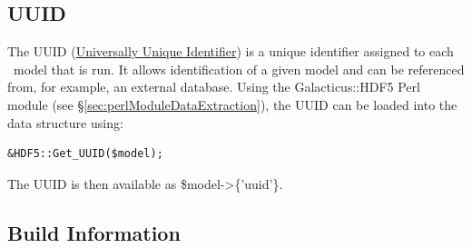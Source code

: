 \subsection{UUID}\label{sec:UUID}

The UUID (\href{https://secure.wikimedia.org/wikipedia/en/wiki/Universally_unique_identifier}{Universally Unique Identifier}) is a unique identifier assigned to each \glc\ model that is run. It allows identification of a given model and can be referenced from, for example, an external database. Using the {\normalfont \ttfamily Galacticus::HDF5} Perl module (see \S\ref{sec:perlModuleDataExtraction}), the UUID can be loaded into the data structure using:
\begin{verbatim}
&HDF5::Get_UUID($model);
\end{verbatim}
The UUID is then available as {\normalfont \ttfamily \$model-\textgreater\{'uuid'\}}.

\subsection{Build Information}\label{sec:BuildInformation}

